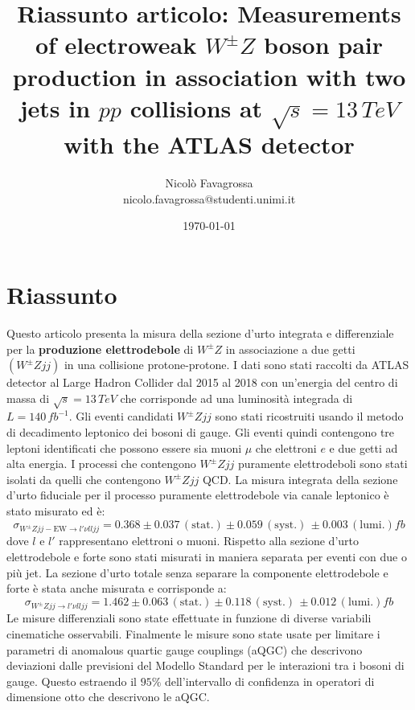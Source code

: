 \documentclass[11pt]{article}
\title{Riassunto articolo: Measurements of electroweak $W^\pm Z$ boson pair production in association with two jets in $pp$ collisions at $\sqrt{s} =13\,\unit{TeV}$ with the ATLAS detector\\ }
\author{Nicolò Favagrossa\\nicolo.favagrossa@studenti.unimi.it}
\date{\today}
\begin{document}
\maketitle
\newpage
\tableofcontents
\newpage
\section{Riassunto}
Questo articolo presenta la misura della sezione d'urto integrata e differenziale per la \textbf{produzione elettrodebole} di $W^\pm Z$ in associazione a due getti $(W^\pm Z j j )$ in una collisione protone-protone. I dati sono stati raccolti da ATLAS detector al Large Hadron Collider dal 2015 al 2018 con un'energia del centro di massa di $\sqrt{s}=13\, \unit{TeV}$ che corrisponde ad una luminosità integrada di $L=140\,\unit{fb}^{-1}$. Gli eventi candidati $W^{\pm}Zjj$ sono stati ricostruiti usando il metodo di decadimento leptonico dei bosoni di gauge. Gli eventi quindi contengono tre leptoni identificati che possono essere sia muoni $\mu$ che elettroni $e$ e due getti ad alta energia. I processi che contengono $W^\pm Zjj$ puramente elettrodeboli sono stati isolati da quelli che contengono $W^\pm Zjj$ QCD. La misura integrata della sezione d'urto fiduciale per il processo puramente elettrodebole via canale leptonico è stato misurato ed è:
\begin{equation}
    \sigma_{{W^\pm Z jj}-{\mathrm{EW}}\to l'\nu l l j j } = 0.368 \pm 0.037 \, (\mathrm{stat.}) \pm 0.059 \, (\mathrm{syst.}) \, \pm 0.003 \, (\mathrm{lumi.}) \unit{fb}
\end{equation}
dove $l$ e $l'$ rappresentano elettroni o muoni. Rispetto alla sezione d'urto elettrodebole e forte sono stati misurati in maniera separata per eventi con due o più jet. La sezione d'urto totale senza separare la componente elettrodebole e forte è stata anche misurata e corrisponde a:
\begin{equation}
    \sigma_{{W^\pm Z jj}\to l'\nu l l j j } = 1.462 \pm 0.063 \, (\mathrm{stat.}) \pm 0.118 \, (\mathrm{syst.}) \, \pm 0.012 \, (\mathrm{lumi.}) \unit{fb}
\end{equation}
Le misure differenziali sono state effettuate in funzione di diverse variabili cinematiche osservabili. Finalmente le misure sono state usate per limitare i parametri di anomalous quartic gauge couplings (aQGC) che descrivono deviazioni dalle previsioni del Modello Standard per le interazioni tra i bosoni di gauge. Questo estraendo il $95\%$ dell'intervallo di confidenza in operatori di dimensione otto che descrivono le aQGC. 
\end{document}
